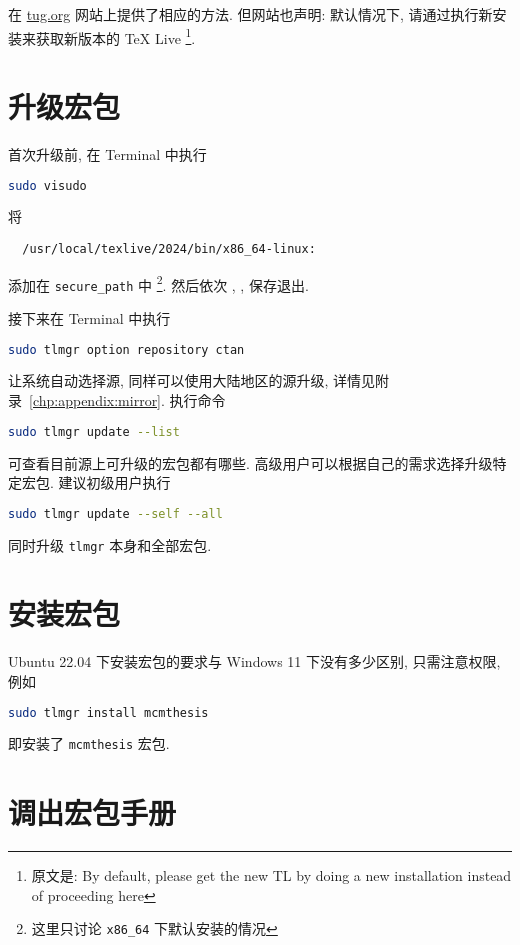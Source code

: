 在 \href{https://www.tug.org/texlive/upgrade.html}{tug.org}
网站上提供了相应的方法.
但网站也声明:
默认情况下,
请通过执行新安装来获取新版本的 \TeX{} Live%
\footnote{原文是: By default,
please get the new TL by doing a new installation instead of proceeding here}.

\section{升级宏包}\label{sec:ubuntu:update}

首次升级前,
在 \textsf{Terminal} 中执行
\begin{lstlisting}[language = bash]
  sudo visudo
\end{lstlisting}
将
\begin{lstlisting}
  /usr/local/texlive/2024/bin/x86_64-linux:
\end{lstlisting}
添加在 \texttt{secure\_path} 中%
\footnote{这里只讨论 \texttt{x86\_64} 下默认安装的情况}.
然后依次 , , \keys{\enter} 保存退出.

接下来在 \textsf{Terminal} 中执行
\begin{lstlisting}[language = bash]
  sudo tlmgr option repository ctan
\end{lstlisting}
让系统自动选择源,
同样可以使用大陆地区的源升级,
详情见附录~\ref{chp:appendix:mirror}.
执行命令
\begin{lstlisting}[language = bash]
  sudo tlmgr update --list
\end{lstlisting}
可查看目前源上可升级的宏包都有哪些. 
高级用户可以根据自己的需求选择升级特定宏包.
建议初级用户执行
\begin{lstlisting}[language = bash]
  sudo tlmgr update --self --all
\end{lstlisting}
同时升级 \texttt{tlmgr} 本身和全部宏包. 

\section{安装宏包}\label{sec:ubuntu:installpackage}

Ubuntu 22.04 下安装宏包的要求与 Windows 11 下没有多少区别, 只需注意权限, 例如
\begin{lstlisting}[language = bash]
  sudo tlmgr install mcmthesis
\end{lstlisting}
即安装了 \texttt{mcmthesis} 宏包.

\section{调出宏包手册}\label{sec:ubuntu:texdoc}

